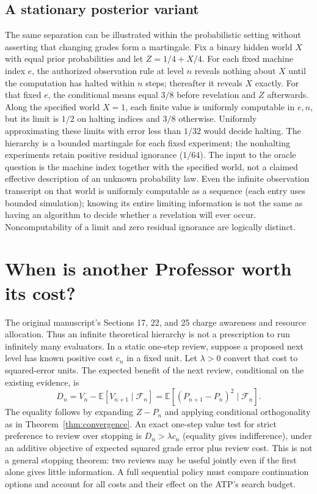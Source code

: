 \documentclass[11pt,letterpaper]{article}
\theoremstyle{definition}\newtheorem{definition}[theorem]{Definition}\newtheorem{example}[theorem]{Example}\newtheorem{conjecture}[theorem]{Conjecture}
\newcommand{\E}{\mathbb E}\newcommand{\PP}{\mathbb P}\newcommand{\F}{\mathcal F}\newcommand{\Var}{\operatorname{Var}}\newcommand{\PC}{\operatorname{PC}}\newcommand{\N}{\mathbb N}
\begin{document}
\subsection{A stationary posterior variant}
The same separation can be illustrated within the probabilistic setting without asserting that changing grades form a martingale. Fix a binary hidden world $X$ with equal prior probabilities and let $Z=1/4+X/4$. For each fixed machine index $e$, the authorized observation rule at level $n$ reveals nothing about $X$ until the computation has halted within $n$ steps; thereafter it reveals $X$ exactly. For that fixed $e$, the conditional means equal $3/8$ before revelation and $Z$ afterwards. Along the specified world $X=1$, each finite value is uniformly computable in $e,n$, but its limit is $1/2$ on halting indices and $3/8$ otherwise. Uniformly approximating these limits with error less than $1/32$ would decide halting. The hierarchy is a bounded martingale for each fixed experiment; the nonhalting experiments retain positive residual ignorance ($1/64$). The input to the oracle question is the machine index together with the specified world, not a claimed effective description of an unknown probability law. Even the infinite observation transcript on that world is uniformly computable as a sequence (each entry uses bounded simulation); knowing its entire limiting information is not the same as having an algorithm to decide whether a revelation will ever occur. Noncomputability of a limit and zero residual ignorance are logically distinct.
\section{When is another Professor worth its cost?}
The original manuscript's Sections 17, 22, and 25 charge awareness and resource allocation. Thus an infinite theoretical hierarchy is not a prescription to run infinitely many evaluators. In a static one-step review, suppose a proposed next level has known positive cost $c_n$ in a fixed unit. Let $\lambda>0$ convert that cost to squared-error units. The expected benefit of the next review, conditional on the existing evidence, is
\[
 D_n=V_n-\E[V_{n+1}\mid\F_n]
     =\E[(P_{n+1}-P_n)^2\mid\F_n].
\]
The equality follows by expanding $Z-P_n$ and applying conditional orthogonality as in Theorem~\ref{thm:convergence}. An exact one-step value test for strict preference to review over stopping is $D_n>\lambda c_n$ (equality gives indifference), under an additive objective of expected squared grade error plus review cost. This is not a general stopping theorem: two reviews may be useful jointly even if the first alone gives little information. A full sequential policy must compare continuation options and account for all costs and their effect on the ATP's search budget.
\end{document}
